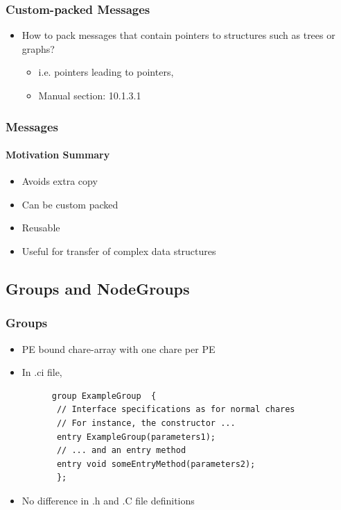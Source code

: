 \begin{frame}[fragile]
  \frametitle{Custom-packed Messages}
  \begin{itemize}
    \item How to pack messages that contain pointers to structures such as trees or graphs?
    \begin{itemize}
       \item i.e. pointers leading to pointers,
       \item Manual section: 10.1.3.1
    \end{itemize}
  \end{itemize}
\end{frame}

\begin{frame}[fragile]
  \frametitle{Messages}
  \framesubtitle{Motivation Summary}
  \begin{itemize}
    \item Avoids extra copy
    \item Can be custom packed
    \item Reusable
    \item Useful for transfer of complex data structures
  \end{itemize}
\end{frame}
\subsection[Groups]{Groups and NodeGroups}
\begin{frame}[fragile]
  \frametitle{Groups}
  \begin{itemize}
    \item PE bound chare-array with one chare per PE
    \item In .ci file, 
    \begin{lstlisting}
      group ExampleGroup  {
       // Interface specifications as for normal chares
       // For instance, the constructor ...
       entry ExampleGroup(parameters1);
       // ... and an entry method
       entry void someEntryMethod(parameters2);
       };
    \end{lstlisting}
    \item No difference in .h and .C file definitions
  \end{itemize}
\end{frame}

